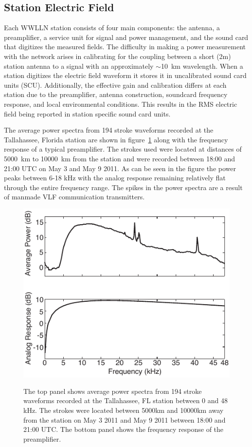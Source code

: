 \subsection{Station Electric Field}

Each WWLLN station consists of four main components: the antenna, a preamplifier, a service unit for signal and power management, and the sound card that digitizes the measured fields.
The difficulty in making a power measurement with the network arises in calibrating for the coupling between a short (2m) station antenna to a signal with an approximately $\sim$10~km wavelength.
When a station digitizes the electric field waveform it stores it in uncalibrated sound card units (SCU).
Additionally, the effective gain and calibration differs at each station due to the preamplifier, antenna construction, soundcard frequency response, and local environmental conditions.
This results in the RMS electric field being reported in station specific sound card units.

The average power spectra from 194 stroke waveforms recorded at the Tallahassee, Florida station are shown in figure~\ref{energy:fig:average_spectra} along with the frequency response of a typical preamplifier.
The strokes used were located at distances of 5000~km to 10000~km from the station and were recorded between 18:00 and 21:00 UTC on May 3 and May 9 2011.
As can be seen in the figure the power peaks between 6-18 kHz with the analog response remaining relatively flat through the entire frequency range.
The spikes in the power spectra are a result of manmade VLF communication transmitters.

\begin{figure}[ht!]
\centering
\includegraphics[scale=1]{energy/Figures/PPS_Spectra.pdf}\\
\caption{The top panel shows average power spectra from 194 stroke waveforms recorded at the Tallahassee, FL station between 0 and 48 kHz. The strokes were located between 5000km and 10000km away from the  station on May 3 2011 and May 9 2011 between 18:00 and 21:00 UTC. The bottom panel shows the frequency response of the preamplifier.}
\label{energy:fig:average_spectra}
\end{figure}

